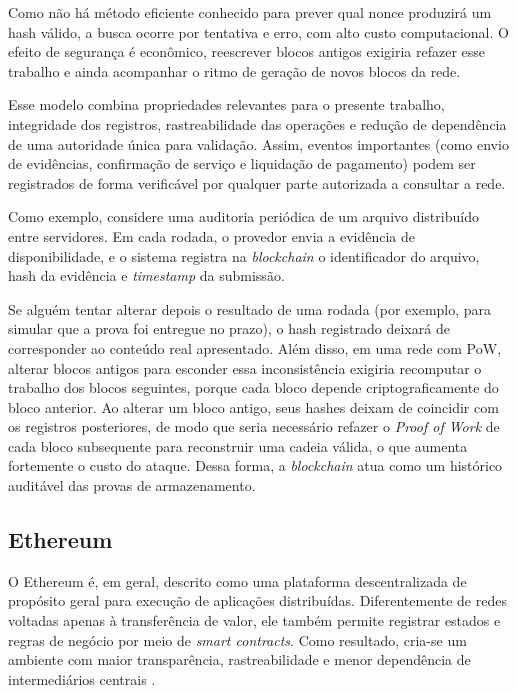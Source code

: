 Como não há método eficiente conhecido para prever qual nonce produzirá um hash válido,
a busca ocorre por tentativa e erro, com alto custo computacional. O efeito de segurança
é econômico, reescrever blocos antigos exigiria refazer esse trabalho e ainda acompanhar
o ritmo de geração de novos blocos da rede.

Esse modelo combina propriedades relevantes para o
presente trabalho, integridade dos registros, rastreabilidade das operações e redução
de dependência de uma autoridade única para validação. Assim, eventos importantes
(como envio de evidências, confirmação de serviço e liquidação de pagamento) podem ser
registrados de forma verificável por qualquer parte autorizada a consultar a rede.

Como exemplo, considere uma auditoria periódica de
um arquivo distribuído entre servidores. Em cada rodada, o provedor envia a evidência
de disponibilidade, e o sistema registra na \emph{blockchain} o identificador
do arquivo, hash da evidência e \emph{timestamp} da submissão.

Se alguém tentar alterar depois o resultado de uma rodada (por exemplo, para simular que
a prova foi entregue no prazo), o hash registrado deixará de corresponder ao conteúdo
real apresentado. Além disso, em uma rede com PoW, alterar blocos antigos para esconder
essa inconsistência exigiria recomputar o trabalho dos blocos seguintes, porque cada
bloco depende criptograficamente do bloco anterior. Ao alterar um bloco antigo, seus
hashes deixam de coincidir com os registros posteriores, de modo que seria necessário
refazer o \emph{Proof of Work} de cada bloco subsequente para reconstruir uma cadeia válida,
o que aumenta fortemente o custo do ataque. Dessa forma, a \emph{blockchain} atua como um
histórico auditável das provas de armazenamento.

\subsection{Ethereum}

O Ethereum é, em geral, descrito como uma plataforma descentralizada de propósito
geral para execução de aplicações distribuídas. Diferentemente de redes voltadas apenas
à transferência de valor, ele também permite registrar estados e regras de negócio por
meio de \emph{smart contracts}. Como resultado, cria-se um ambiente com maior
transparência, rastreabilidade e menor dependência de intermediários centrais \cite{buterin2014next,wood2014yellowpaper}.

